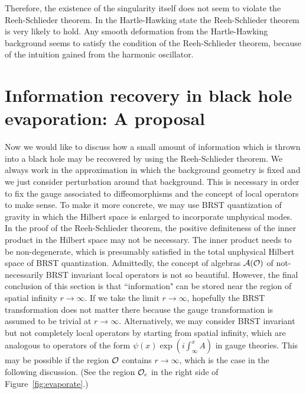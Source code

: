 \documentclass[a4paper,11pt]{article}
\theoremstyle{plain}
\theoremstyle{definition}
\numberwithin{thm}{section}
\def\CA{{\cal A}}
\def\CO{{\cal O}}
\begin{document}
Therefore, the existence of the singularity itself does not seem to violate the Reeh-Schlieder theorem.
In the Hartle-Hawking state the Reeh-Schlieder theorem is very likely to hold.
Any smooth deformation from the Hartle-Hawking background seems to satisfy the condition of the Reeh-Schlieder theorem,
because of the intuition gained from the harmonic oscillator. 








\section{Information recovery in black hole evaporation: A proposal}
Now we would like to discuss how a small amount of information which is thrown into a black hole may be recovered by using the Reeh-Schlieder theorem.
We always work in the approximation in which the background geometry is fixed and we just consider perturbation around that background.
This is necessary in order to fix the gauge associated to diffeomorphisms and the concept of local operators to make sense. %
To make it more concrete, we may use BRST quantization of gravity in which the Hilbert space is enlarged to incorporate unphysical modes. In the proof of the Reeh-Schlieder theorem,
the positive definiteness of the inner product in the Hilbert space may not be necessary. The inner product needs to be non-degenerate, which is presumably 
satisfied in the total unphysical Hilbert space of BRST quantization. Admittedly, the concept of algebras $\CA(\CO)$ of
not-necessarily BRST invariant local operators is not so beautiful. However, the final conclusion of this section is that ``information" can be stored near the region 
of spatial infinity $r \to \infty$. If we take the limit $r \to \infty$, hopefully the BRST transformation does not matter there because the gauge transformation
is assumed to be trivial at $r \to \infty$. Alternatively, we may consider BRST invariant but not completely local operators by starting from spatial infinity,
which are analogous to operators of the form $\psi(x) \exp( i \int^x_\infty A)$ in gauge theories. This may be possible if the region $\CO$ contains $r \to \infty$, which is the case
in the following discussion. (See the region $\CO_c$ in the right side of Figure~\ref{fig:evaporate}.)
\end{document}

